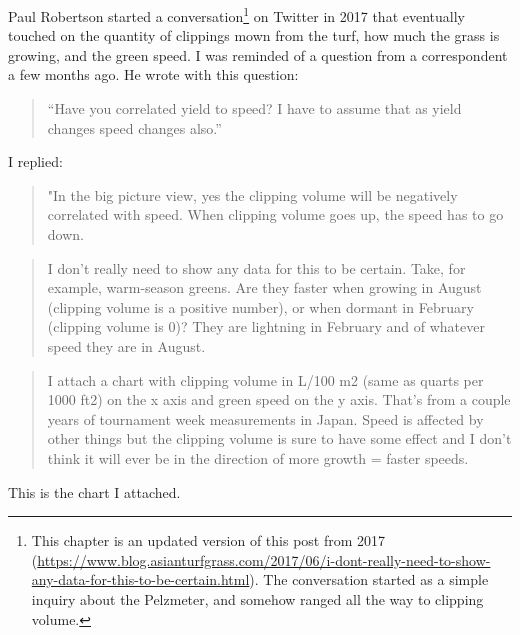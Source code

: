 \documentclass[12pt,b5,]{tufte-book}
\begin{document}
Paul Robertson started a conversation\footnote{This chapter is an updated version of this post from 2017 (\url{https://www.blog.asianturfgrass.com/2017/06/i-dont-really-need-to-show-any-data-for-this-to-be-certain.html}). The conversation started as a simple inquiry about the Pelzmeter, and somehow ranged all the way to clipping volume.} on Twitter in 2017 that eventually touched on the quantity of clippings mown from the turf, how much the grass is growing, and the green speed. I was reminded of a question from a correspondent a few months ago. He wrote with this question:

\begin{quote}
``Have you correlated yield to speed? I have to assume that as yield changes speed changes also.''
\end{quote}

I replied:

\begin{quote}
"In the big picture view, yes the clipping volume will be negatively correlated with speed. When clipping volume goes up, the speed has to go down.
\end{quote}

\begin{quote}
I don't really need to show any data for this to be certain. Take, for example, warm-season greens. Are they faster when growing in August (clipping volume is a positive number), or when dormant in February (clipping volume is 0)? They are lightning in February and of whatever speed they are in August.
\end{quote}

\begin{quote}
I attach a chart with clipping volume in L/100 m2 (same as quarts per 1000 ft2) on the x axis and green speed on the y axis. That's from a couple years of tournament week measurements in Japan. Speed is affected by other things but the clipping volume is sure to have some effect and I don't think it will ever be in the direction of more growth = faster speeds.
\end{quote}

This is the chart I attached.
\end{document}

